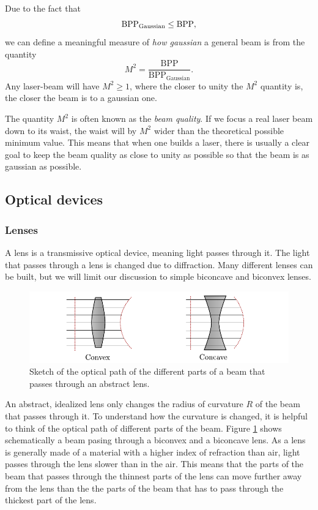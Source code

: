 \documentclass[a4paper, 11pt, notitlepage, english]{article}
\begin{document}
Due to the fact that 
$$\mbox{BPP}_{\rm Gaussian} \leq \mbox{BPP},$$
we can define a meaningful measure of \emph{how gaussian} a general beam is from the quantity
$$M^2 = \frac{\mbox{BPP}}{\mbox{BPP}_{\mbox {Gaussian}}}.$$
Any laser-beam will have $M^2 \geq 1$, where the closer to unity the $M^2$ quantity is, the closer the beam is to a gaussian one.

The quantity $M^2$ is often known as the \emph{beam quality}. If we focus a real laser beam down to its waist, the waist will by $M^2$ wider than the theoretical possible minimum value. This means that when one builds a laser, there is usually a clear goal to keep the beam quality as close to unity as possible so that the beam is as gaussian as possible.

\subsection{Optical devices}

\subsubsection{Lenses}

A lens is a transmissive optical device, meaning light passes through it. The light that passes through a lens is changed due to diffraction. Many different lenses can be built, but we will limit our discussion to simple biconcave and biconvex lenses.

\begin{figure}[htpb]
\includegraphics[width=\textwidth]{lenses.pdf}	
\caption{Sketch of the optical path of the different parts of a beam that passes through an abstract lens. \label{fig:lenses}}
\end{figure}

An abstract, idealized lens only changes the radius of curvature $R$ of the beam that passes through it. To understand how the curvature is changed, it is helpful to think of the optical path of different parts of the beam. Figure \ref{fig:lenses} shows schematically a beam pasing through a biconvex and a biconcave lens. As a lens is generally made of a material with a higher index of refraction than air, light passes through the lens slower than in the air. This means that the parts of the beam that passes through the thinnest parts of the lens can move further away from the lens than the the parts of the beam that has to pass through the thickest part of the lens. 
\end{document}

